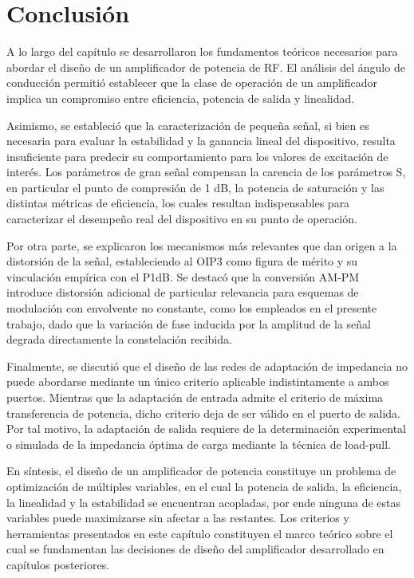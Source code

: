\section{Conclusión}
A lo largo del capítulo se desarrollaron los fundamentos teóricos necesarios para abordar el diseño de un amplificador de potencia de RF. El análisis del ángulo de conducción permitió establecer que la clase de operación de un amplificador implica un compromiso entre eficiencia, potencia de salida y linealidad. 

Asimismo, se estableció que la caracterización de pequeña señal, si bien es necesaria para evaluar la estabilidad y la ganancia lineal del dispositivo, resulta insuficiente para predecir su comportamiento para los valores de excitación de interés. Los parámetros de gran señal compensan la carencia de los parámetros S, en particular el punto de compresión de 1 dB, la potencia de saturación y las distintas métricas de eficiencia, los cuales resultan indispensables para caracterizar el desempeño real del dispositivo en su punto de operación.

Por otra parte, se explicaron los mecanismos más relevantes que dan origen a la distorsión de la señal, estableciendo al OIP3 como figura de mérito y su vinculación empírica con el P1dB. Se destacó que la conversión AM-PM introduce distorsión adicional de particular relevancia para esquemas de modulación con envolvente no constante, como los empleados en el presente trabajo, dado que la variación de fase inducida por la amplitud de la señal degrada directamente la constelación recibida.

Finalmente, se discutió que el diseño de las redes de adaptación de impedancia no puede abordarse mediante un único criterio aplicable indistintamente a ambos puertos. Mientras que la adaptación de entrada admite el criterio de máxima transferencia de potencia, dicho criterio deja de ser válido en el puerto de salida. Por tal motivo, la adaptación de salida requiere de la determinación experimental o simulada de la impedancia óptima de carga mediante la técnica de load-pull.

En síntesis, el diseño de un amplificador de potencia constituye un problema de optimización de múltiples variables, en el cual la potencia de salida, la eficiencia, la linealidad y la estabilidad se encuentran acopladas, por ende ninguna de estas variables puede maximizarse sin afectar a las restantes. Los criterios y herramientas presentados en este capítulo constituyen el marco teórico sobre el cual se fundamentan las decisiones de diseño del amplificador desarrollado en capítulos posteriores.